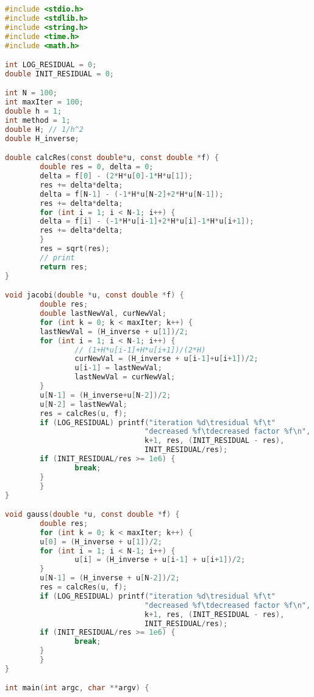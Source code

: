 \documentclass[titlepage]{article}
\begin{document}
\newpage
\begin{lstlisting}[language=c, basicstyle=\small]
#include <stdio.h>
#include <stdlib.h>
#include <string.h>
#include <time.h>
#include <math.h>

int LOG_RESIDUAL = 0;
double INIT_RESIDUAL = 0;

int N = 100;
int maxIter = 100;
double h = 1;
int method = 1;
double H; // 1/h^2
double H_inverse;

double calcRes(const double*u, const double *f) {
        double res = 0, delta = 0;
        delta = f[0] - (2*H*u[0]-1*H*u[1]);
        res += delta*delta;
        delta = f[N-1] - (-1*H*u[N-2]+2*H*u[N-1]);
        res += delta*delta;
        for (int i = 1; i < N-1; i++) {
        delta = f[i] - (-1*H*u[i-1]+2*H*u[i]-1*H*u[i+1]);
        res += delta*delta;
        }
        res = sqrt(res);
        // print
        return res;
}

void jacobi(double *u, const double *f) {
        double res;
        double lastNewVal, curNewVal;
        for (int k = 0; k < maxIter; k++) {
        lastNewVal = (H_inverse + u[1])/2;
        for (int i = 1; i < N-1; i++) {
                // (1+H*u[i-1]+H*u[i+1])/(2*H)
                curNewVal = (H_inverse + u[i-1]+u[i+1])/2;
                u[i-1] = lastNewVal;
                lastNewVal = curNewVal;
        }
        u[N-1] = (H_inverse+u[N-2])/2;
        u[N-2] = lastNewVal;
        res = calcRes(u, f);
        if (LOG_RESIDUAL) printf("iteration %d\tresidual %f\t"
                                "decreased %f\tdecreased factor %f\n", 
                                k+1, res, (INIT_RESIDUAL - res), 
                                INIT_RESIDUAL/res);
        if (INIT_RESIDUAL/res >= 1e6) {
                break;
        }
        }
}

void gauss(double *u, const double *f) {
        double res;
        for (int k = 0; k < maxIter; k++) {
        u[0] = (H_inverse + u[1])/2;
        for (int i = 1; i < N-1; i++) {
                u[i] = (H_inverse + u[i-1] + u[i+1])/2;
        }
        u[N-1] = (H_inverse + u[N-2])/2;
        res = calcRes(u, f);
        if (LOG_RESIDUAL) printf("iteration %d\tresidual %f\t"
                                "decreased %f\tdecreased factor %f\n", 
                                k+1, res, (INIT_RESIDUAL - res), 
                                INIT_RESIDUAL/res);
        if (INIT_RESIDUAL/res >= 1e6) {
                break;
        }
        }
}

int main(int argc, char **argv) {


\end{lstlisting}
\end{document}
